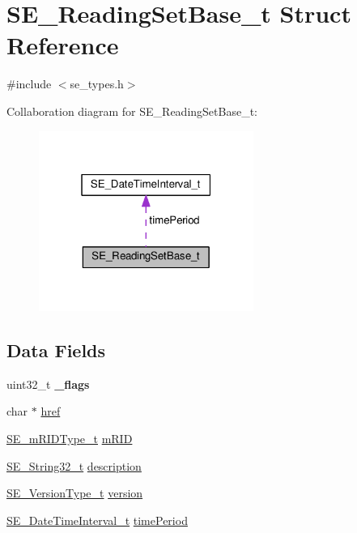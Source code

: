 \hypertarget{structSE__ReadingSetBase__t}{}\section{S\+E\+\_\+\+Reading\+Set\+Base\+\_\+t Struct Reference}
\label{structSE__ReadingSetBase__t}


{\ttfamily \#include $<$se\+\_\+types.\+h$>$}



Collaboration diagram for S\+E\+\_\+\+Reading\+Set\+Base\+\_\+t\+:\nopagebreak
\begin{figure}[H]
\begin{center}
\leavevmode
\includegraphics[width=199pt]{structSE__ReadingSetBase__t__coll__graph}
\end{center}
\end{figure}
\subsection*{Data Fields}
\begin{DoxyCompactItemize}
\item 
uint32\+\_\+t {\bfseries \+\_\+flags}
\item 
char $\ast$ \hyperlink{group__ReadingSetBase_ga4c94838462ed93e356089d894b4b408d}{href}
\item 
\hyperlink{group__mRIDType_gac74622112f3a388a2851b2289963ba5e}{S\+E\+\_\+m\+R\+I\+D\+Type\+\_\+t} \hyperlink{group__ReadingSetBase_ga7189226865c8cc699d86933793edbe14}{m\+R\+ID}
\item 
\hyperlink{group__String32_gac9f59b06b168b4d2e0d45ed41699af42}{S\+E\+\_\+\+String32\+\_\+t} \hyperlink{group__ReadingSetBase_ga6e8ece381fda08a0af90abd901be7aec}{description}
\item 
\hyperlink{group__VersionType_ga4b8d27838226948397ed99f67d46e2ae}{S\+E\+\_\+\+Version\+Type\+\_\+t} \hyperlink{group__ReadingSetBase_gacf87694263f9fa1022f9d5a28d2eb694}{version}
\item 
\hyperlink{structSE__DateTimeInterval__t}{S\+E\+\_\+\+Date\+Time\+Interval\+\_\+t} \hyperlink{group__ReadingSetBase_ga4da03480f642318baf9793c7ff5e1006}{time\+Period}
\end{DoxyCompactItemize}


